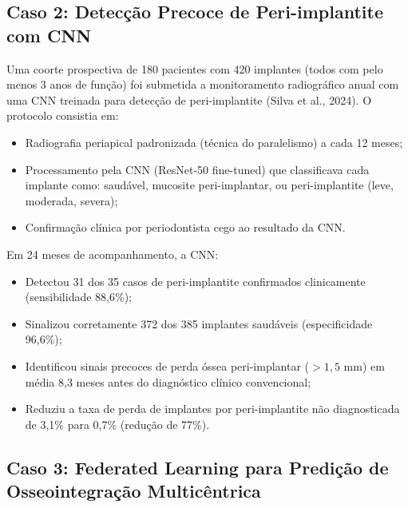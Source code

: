 \subsection{Caso 2: Detecção Precoce de Peri-implantite com CNN}

Uma coorte prospectiva de 180 pacientes com 420 implantes (todos com pelo menos 3 anos de função) foi submetida a monitoramento radiográfico anual com uma CNN treinada para detecção de peri-implantite (Silva et al., 2024). O protocolo consistia em:
\begin{itemize}
    \item Radiografia periapical padronizada (técnica do paralelismo) a cada 12 meses;
    \item Processamento pela CNN (ResNet-50 fine-tuned) que classificava cada implante como: saudável, mucosite peri-implantar, ou peri-implantite (leve, moderada, severa);
    \item Confirmação clínica por periodontista cego ao resultado da CNN.
\end{itemize}

Em 24 meses de acompanhamento, a CNN:
\begin{itemize}
    \item Detectou 31 dos 35 casos de peri-implantite confirmados clinicamente (sensibilidade 88,6\%);
    \item Sinalizou corretamente 372 dos 385 implantes saudáveis (especificidade 96,6\%);
    \item Identificou sinais precoces de perda óssea peri-implantar ($>1,5$ mm) em média 8,3 meses antes do diagnóstico clínico convencional;
    \item Reduziu a taxa de perda de implantes por peri-implantite não diagnosticada de 3,1\% para 0,7\% (redução de 77\%).
\end{itemize}


\subsection{Caso 3: Federated Learning para Predição de Osseointegração Multicêntrica}

